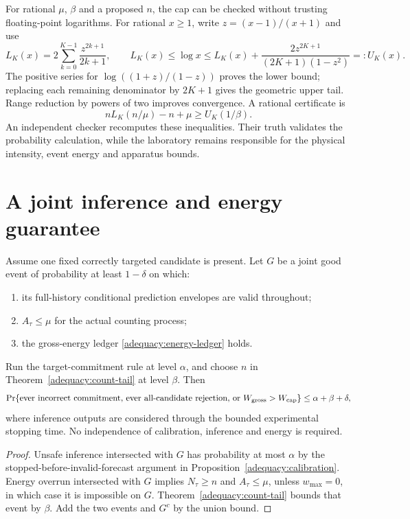 For rational $\mu$, $\beta$ and a proposed $n$, the cap can be checked without
trusting floating-point logarithms. For rational $x\geq1$, write
$z=(x-1)/(x+1)$ and use
\[
 L_K(x)=2\sum_{k=0}^{K-1}\frac{z^{2k+1}}{2k+1},\qquad
 L_K(x)\leq\log x\leq L_K(x)+
 \frac{2z^{2K+1}}{(2K+1)(1-z^2)}=:U_K(x).
\]
The positive series for $\log((1+z)/(1-z))$ proves the lower bound; replacing
each remaining denominator by $2K+1$ gives the geometric upper tail. Range
reduction by powers of two improves convergence. A rational certificate is
\[
 nL_K(n/\mu)-n+\mu\geq U_K(1/\beta).
\]
An independent checker recomputes these inequalities. Their truth validates the
probability calculation, while the laboratory remains responsible for the
physical intensity, event energy and apparatus bounds.

\section{A joint inference and energy guarantee}

\begin{theorem}
\label{adequacy:joint}
Assume one fixed correctly targeted candidate is present. Let $G$ be a joint
good event of probability at least $1-\delta$ on which:
\begin{enumerate}
 \item its full-history conditional prediction envelopes are valid throughout;
 \item $A_\tau\leq\mu$ for the actual counting process;
 \item the gross-energy ledger \eqref{adequacy:energy-ledger} holds.
\end{enumerate}
Run the target-commitment rule at level $\alpha$, and choose $n$ in
Theorem~\ref{adequacy:count-tail} at level $\beta$. Then
\begin{equation}
 \Pr\{\text{ever incorrect commitment, ever all-candidate rejection,
       or }W_{\rm gross}>W_{\rm cap}\}
 \leq\alpha+\beta+\delta,
 \label{adequacy:joint-equation}
\end{equation}
where inference outputs are considered through the bounded experimental stopping
time. No independence of calibration, inference and energy is required.
\end{theorem}
\begin{proof}
Unsafe inference intersected with $G$ has probability at most $\alpha$ by the
stopped-before-invalid-forecast argument in
Proposition~\ref{adequacy:calibration}. Energy overrun intersected with $G$
implies $N_\tau\geq n$ and $A_\tau\leq\mu$, unless $w_{\max}=0$, in which case
it is impossible on $G$. Theorem~\ref{adequacy:count-tail} bounds that event by
$\beta$. Add the two events and $G^c$ by the union bound.
\end{proof}

